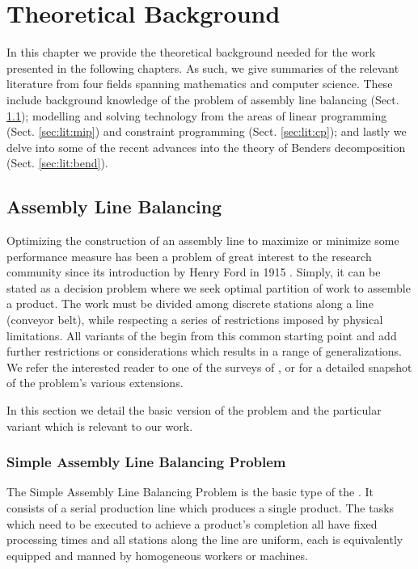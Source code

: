 
\chapter{Theoretical Background} \label{chap:theory}
In this chapter we provide the theoretical background needed
for the work presented in the following chapters.
As such, we give summaries of the relevant literature from
four fields spanning mathematics and computer science.
These include background knowledge of the problem of assembly
line balancing (Sect. \ref{sec:lit:ALB}); modelling and solving technology from the areas
of linear programming (Sect. \ref{sec:lit:mip}) and constraint programming (Sect. \ref{sec:lit:cp});
and lastly we delve into some of the recent
advances into the theory of Benders decomposition (Sect. \ref{sec:lit:bend}).

\section{Assembly Line Balancing}
\label{sec:lit:ALB}
Optimizing the construction of an assembly line to maximize or minimize 
some performance measure has been a problem of great interest to the 
research community since its introduction by Henry Ford
in 1915 \cite{Ford1922}.
Simply, it can be stated as a decision problem
where we seek optimal partition of work to assemble
a product.
The work must be divided
among discrete stations along a line (\eg conveyor belt),
while respecting a series of restrictions imposed by physical
limitations.
All variants of the \albp{} begin from this common starting point
and add further restrictions or considerations which
results in a range of generalizations.
We refer the interested reader to one of the surveys
of ,
 or
 for a detailed snapshot of
the problem's various extensions.

In this section we detail the basic version of the 
problem and the particular variant which
is relevant to our work.

\subsection{Simple Assembly Line Balancing Problem}
\label{sec:lit:SALBP}
The Simple Assembly Line Balancing Problem is the basic
type of the \albp{} \cite{Baybars1986,Scholl1999}.
It consists of a serial production line which produces a 
single product.
The tasks which need to be executed to achieve a product's completion
all have fixed processing times and all stations
along the line are uniform, \ie each is equivalently equipped
and manned by homogeneous workers or machines.

